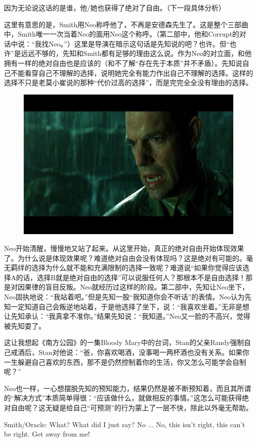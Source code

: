 \documentclass[UTF8]{ctexart}
\newenvironment{myquote}{\color{green} \setlength{\leftskip}{6em} \setlength{\rightskip}{4em} \setlength{\parindent}{-2em}}{\par}
\begin{document}
因为无论说这话的是谁，他/她也获得了绝对了自由。（下一段具体分析）

这里有意思的是，Smith用Neo称呼他了，不再是安德森先生了。这是整个三部曲中，Smith唯一一次当着Neo的面用Neo这个称呼。（第二部中，他和Corrupt的对话中说：“我找Neo。”）这里是导演在暗示这句话是先知说的吧？也许。但“也许”是远远不够的，先知和Smith都有足够的理由这么说。作为Neo的对立面，和他拥有一样的绝对自由也是应该的（和不了解“存在先于本质”并不矛盾）。先知说自己不能看穿自己不理解的选择，说明她完全有能力作出自己不理解的选择。这样的选择不只是老莫小崔说的那种“代价过高的选择”，而是完完全全没有理由的选择。

\begin{figure}[htb]
\centering
\includegraphics[width=0.5\linewidth]{fig/b45db90e8035ace437d12224.jpg}
\end{figure}

Neo开始清醒，慢慢地又站了起来。从这里开始，真正的绝对自由开始体现效果了。为什么说是体现效果呢？难道绝对自由会没有体现吗？这是绝对有可能的。毫无羁绊的选择为什么就不能和充满限制的选择一致呢？难道说“如果你觉得应该选择A的话，选择B就是绝对自由的选择”可以说服任何人？那根本不是自由选择！那是对因果律的盲目反叛。Neo就经历过这样的阶段。第二部中，先知让Neo坐下，Neo固执地说：“我站着吧。”但是先知一股“我知道你会不听话”的表情。Neo认为先知一定知道自己会叛逆地站着，于是他选择了坐下，说：“我喜欢坐着。”无非是想让先知承认：“我真拿不准你。”结果先知说：“我知道。”Neo又一脸的不高兴，觉得被先知耍了。

这让我想起《南方公园》的一集Bloody Mary中的台词，Stan的父亲Randy强制自己戒酒后，Stan对他说：“爸，你喜欢喝酒，没事喝一两杯酒也没有关系。如果你一生躲避自己喜欢的东西，那不是仍然控制着你的生活，你又怎么可能学会自制呢？”

Neo也一样，一心想摆脱先知的预知能力，结果仍然是被不断预知着，而且其所谓的“解决方式”本质简单得很：“应该做什么，就做相反的事情。”这怎么可能获得绝对自由呢？这无疑是给自己“可预测”的行为蒙上了一层不快，除此以外毫无帮助。

\begin{myquote}
Smith/Oracle: What? What did I just say? No ... No, this isn't right, this can't be right. Get away from me!
\end{myquote}
\end{document}
